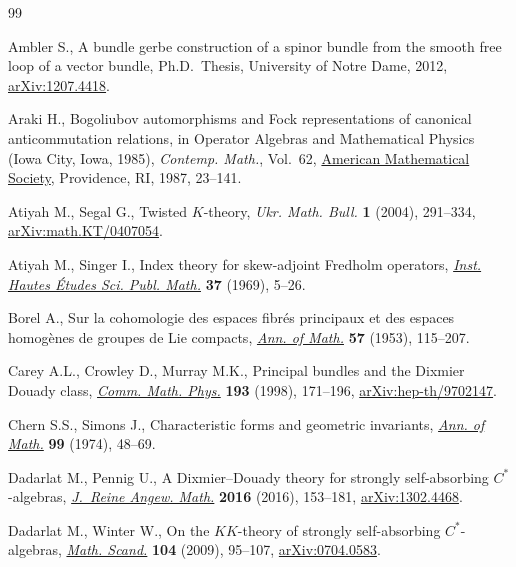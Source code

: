 \begin{thebibliography}{99}
\footnotesize\itemsep=0pt

Ambler S., A bundle gerbe construction of a spinor bundle from the smooth free
 loop of a vector bundle, Ph.D.~Thesis, {U}niversity of {N}otre {D}ame, 2012,
 \href{https://arxiv.org/abs/1207.4418}{arXiv:1207.4418}.

Araki H., Bogoliubov automorphisms and {F}ock representations of canonical
 anticommutation relations, in Operator {A}lgebras and {M}athematical
 {P}hysics ({I}owa {C}ity, {I}owa, 1985), \textit{Contemp. Math.}, Vol.~62,
  \href{https://doi.org/10.1090/conm/062/878376}{American Mathematical Society}, Providence, RI, 1987, 23--141.

Atiyah M., Segal G., Twisted {$K$}-theory, \textit{Ukr. Math. Bull.} \textbf{1}
 (2004), 291--334, \href{https://arxiv.org/abs/math.KT/0407054}{arXiv:math.KT/0407054}.

Atiyah M., Singer I., Index theory for skew-adjoint {F}redholm operators,
  \href{https://doi.org/10.1007/BF02684885}{\textit{Inst. Hautes \'Etudes Sci. Publ. Math.}} \textbf{37} (1969), 5--26.

Borel A., Sur la cohomologie des espaces fibr\'es principaux et des espaces
 homog\`enes de groupes de {L}ie compacts, \href{https://doi.org/10.2307/1969728}{\textit{Ann. of Math.}} \textbf{57}
 (1953), 115--207.

Carey A.L., Crowley D., Murray M.K., Principal bundles and the {D}ixmier
 {D}ouady class, \href{https://doi.org/10.1007/s002200050323}{\textit{Comm. Math. Phys.}} \textbf{193} (1998), 171--196,
 \href{https://arxiv.org/abs/hep-th/9702147}{arXiv:hep-th/9702147}.

Chern S.S., Simons J., Characteristic forms and geometric invariants,
 \href{https://doi.org/10.2307/1971013}{\textit{Ann. of Math.}} \textbf{99} (1974), 48--69.

Dadarlat M., Pennig U., A {D}ixmier--{D}ouady theory for strongly
 self-absorbing {$C^*$}-algebras,  \href{https://doi.org/10.1515/crelle-2014-0044}{\textit{J.~Reine Angew. Math.}} \textbf{2016}
 (2016), 153--181, \href{https://arxiv.org/abs/1302.4468}{arXiv:1302.4468}.

Dadarlat M., Winter W., On the {$KK$}-theory of strongly self-absorbing
 {$C^*$}-algebras,  \href{https://doi.org/10.7146/math.scand.a-15086}{\textit{Math. Scand.}} \textbf{104} (2009), 95--107,
 \href{https://arxiv.org/abs/0704.0583}{arXiv:0704.0583}.


\end{thebibliography}
